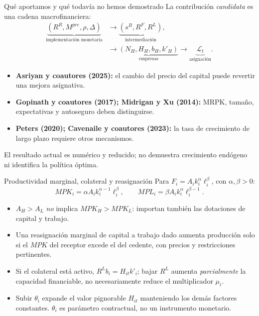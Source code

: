 \documentclass[aspectratio=169,11pt]{beamer}
\begin{document}
\begin{frame}{Qué aportamos y qué todavía no hemos demostrado}
\small
La contribución \emph{candidata} es una cadena macrofinanciera:
\[
\begin{aligned}
\underbrace{(R^R,M^{pre},\rho,\Delta)}_{\text{implementación monetaria}}
&\longrightarrow
\underbrace{(s^B,R^F,R^L)}_{\text{intermediación}},\\
&\longrightarrow
\underbrace{(N_H,H_H,b_H,k'_H)}_{\text{empresas}}
\longrightarrow
\underbrace{\mathcal L_{t}}_{\text{asignación}}.
\end{aligned}
\]
\medskip
\begin{itemize}
\item \textbf{Asriyan y coautores (2025):} el cambio del precio del
capital puede revertir una mejora asignativa.
\item \textbf{Gopinath y coautores (2017); Midrigan y Xu (2014):}
MRPK, tamaño, expectativas y autoseguro deben distinguirse.
\item \textbf{Peters (2020); Cavenaile y coautores (2023):}
la tasa de crecimiento de largo plazo requiere otros mecanismos.
\end{itemize}
\footnotesize
El resultado actual es numérico y reducido; no demuestra
crecimiento endógeno ni identifica la política óptima.
\end{frame}

\begin{frame}{Productividad marginal, colateral y reasignación}
\small
Para $F_i=A_i k_i^\alpha \ell_i^\beta$, con $\alpha,\beta>0$:
\[
MPK_i=\alpha A_i k_i^{\alpha-1}\ell_i^\beta,\qquad
MPL_i=\beta A_i k_i^\alpha\ell_i^{\beta-1}.
\]
\begin{itemize}
\item $A_H>A_L$ \emph{no} implica $MPK_H>MPK_L$: importan también las dotaciones de capital y trabajo.
\item Una reasignación marginal de capital a trabajo dado aumenta producción solo si el $MPK$ del receptor excede el del cedente, con precios y restricciones pertinentes.
\item Si el colateral está activo, $R^L b_i=H_{it}k'_i$; bajar $R^L$ aumenta \emph{parcialmente} la capacidad financiable, no necesariamente reduce el multiplicador $\mu_i$.
\item Subir $\theta_i$ expande el valor pignorable $H_{it}$ manteniendo los demás factores constantes. $\theta_i$ es parámetro contractual, no un instrumento monetario.
\end{itemize}
\end{frame}
\end{document}
